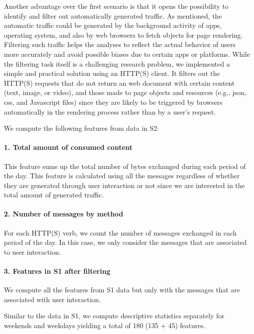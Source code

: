 Another advantage over the first scenario is that it opens the possibility to identify and filter out automatically generated traffic. As mentioned, the automatic traffic could be generated by the background activity of apps, operating system, and also by web browsers to fetch objects for page rendering. Filtering such traffic helps the analyses to reflect the actual behavior of users more accurately and avoid possible biases due to certain apps or platforms. While the filtering task itself is a challenging research problem, we implemented a simple and practical solution using an HTTP(S) client. It filters out the HTTP(S) requests that do not return an web document with certain content (text, image, or video), and those made to page objects and resources (e.g., json, css, and Javascript files) since they are likely to be triggered by browsers automatically in the rendering process rather than by a user's request. 

We compute the following features from data in S2: 

\paragraph{1. Total amount of consumed content} This feature sums up the total number of bytes exchanged during each period of the day. This feature is calculated using all the messages regardless of whether they are generated through user interaction or not since we are interested in the total amount of generated traffic. 

\paragraph{2. Number of messages by method} For each HTTP(S) verb, we count the number of messages exchanged in each period of the day. In this case, we only consider the messages that are associated to user interaction.

\paragraph{3. Features in S1 after filtering} We compute all the features from S1 data but only with the messages that are associated with user interaction.  

Similar to the data in S1, we compute descriptive statistics separately for weekends and weekdays yielding a total of 180 (135 + 45) features.

